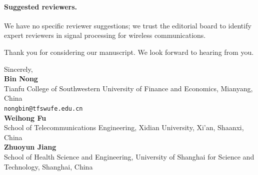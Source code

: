 \documentclass[11pt,a4paper]{article}
\begin{document}
\paragraph{Suggested reviewers.}
We have no specific reviewer suggestions; we trust the editorial board to identify expert reviewers in signal processing for wireless communications.

\vspace{1em}

\noindent Thank you for considering our manuscript. We look forward to hearing from you.

\vspace{2em}

\noindent Sincerely,\\[1.4em]
\textbf{Bin Nong}\\
Tianfu College of Southwestern University of Finance and Economics, Mianyang, China\\
\texttt{nongbin@tfswufe.edu.cn}\\[0.6em]
\textbf{Weihong Fu}\\
School of Telecommunications Engineering, Xidian University, Xi'an, Shaanxi, China\\[0.6em]
\textbf{Zhuoyun Jiang}\\
School of Health Science and Engineering, University of Shanghai for Science and Technology, Shanghai, China
\end{document}

